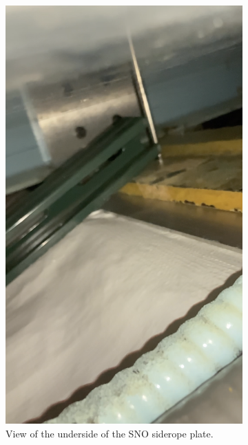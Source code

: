 \documentclass[11pt]{article}
\begin{document}
\begin{figure}[htbp]
\begin{center}
\begin{subfigure}{0.45\textwidth}
	\includegraphics[width=\textwidth]{UnderPlate}
	\caption{View of the underside of the SNO siderope plate.}
	\label{fig:belowplate}
	\end{subfigure}
	\begin{subfigure}{0.45\textwidth}

\end{subfigure}
\end{center}
\end{figure}
\end{document}
